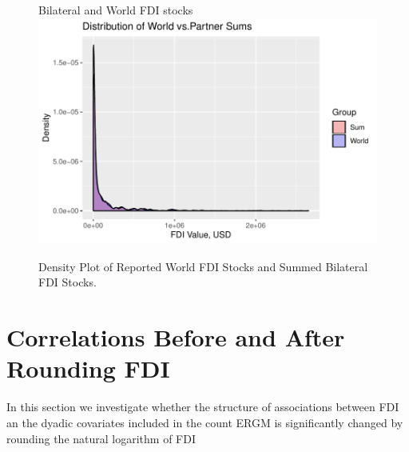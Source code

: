 \documentclass[reqno,onecolumn,letterpaper,12pt]{article}
\begin{document}
\begin{figure}[!h]
\centering
Bilateral and World FDI stocks\\
\includegraphics[height=.4\textheight, clip=true, trim=0cm 0cm 0cm .6cm]{SI_figures/descriptive_plots/check_sums.pdf} \vspace{0cm}
\caption{\label{fig:flows} Density Plot of Reported World FDI Stocks and Summed Bilateral FDI Stocks.}
\end{figure}







\section{Correlations Before and After Rounding FDI} 

In this section we investigate whether the structure of associations between FDI an the dyadic covariates included in the count ERGM is significantly changed by rounding the natural logarithm of FDI
\end{document}
